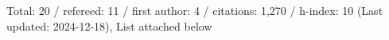 Total: 20 / refereed: 11 / first author: 4 / citations: 1,270 / h-index: 10 (Last updated: 2024-12-18), List attached below